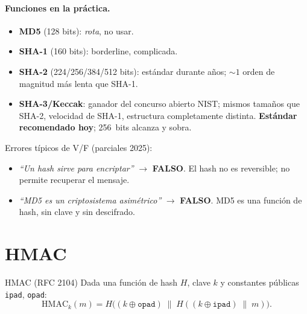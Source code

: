 \documentclass[11pt,a4paper]{article}
\begin{document}
\paragraph{Funciones en la pr\'actica.}
\begin{itemize}[leftmargin=1.4em,nosep]
  \item \textbf{MD5} (128 bits): \emph{rota}, no usar.
  \item \textbf{SHA-1} (160 bits): borderline, complicada.
  \item \textbf{SHA-2} (224/256/384/512 bits): est\'andar durante a\~nos; $\sim1$
        orden de magnitud m\'as lenta que SHA-1.
  \item \textbf{SHA-3/Keccak}: ganador del concurso abierto NIST; mismos tama\~nos
        que SHA-2, velocidad de SHA-1, estructura completamente distinta.
        \textbf{Est\'andar recomendado hoy}; 256~bits alcanza y sobra.
\end{itemize}

\begin{ojo}
Errores t\'ipicos de V/F (parciales 2025):
\begin{itemize}[leftmargin=1.4em,nosep]
  \item \textit{``Un hash sirve para encriptar''} $\to$ \textbf{FALSO}.
        El hash no es reversible; no permite recuperar el mensaje.
  \item \textit{``MD5 es un criptosistema asim\'etrico''} $\to$ \textbf{FALSO}.
        MD5 es una funci\'on de hash, sin clave y sin descifrado.
\end{itemize}
\end{ojo}

\section{HMAC}

\begin{definicion}{HMAC (RFC 2104)}
Dada una funci\'on de hash $H$, clave $k$ y constantes p\'ublicas
\texttt{ipad}, \texttt{opad}:
\[
  \mathrm{HMAC}_k(m)
  = H\!\bigl((k\oplus\texttt{opad})\;\|\;
             H((k\oplus\texttt{ipad})\;\|\;m)\bigr).
\]
\end{definicion}
\end{document}
